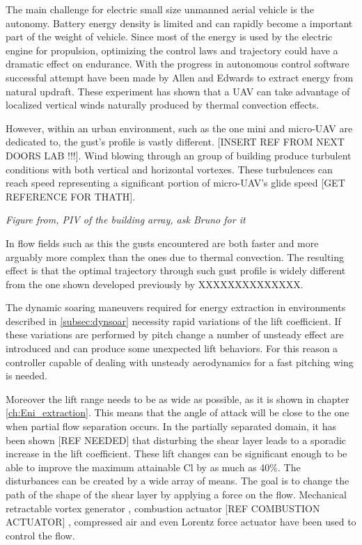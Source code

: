 
 \label{subsec:dynsoar}
The main challenge for electric small size unmanned aerial vehicle is the autonomy.
Battery energy density is limited and can rapidly become a important part of the weight of vehicle.
Since most of the energy is used by the electric engine for propulsion, optimizing the control laws and trajectory could have a dramatic effect on endurance. 
With the progress in autonomous control software successful attempt have been made by Allen \cite{flight_test_soaring_NASA} and Edwards \cite{flight_test_soaring_NCU} to extract energy from natural updraft.
These experiment has shown that a UAV can take advantage of localized vertical winds naturally produced by thermal convection effects.

\par However, within an urban environment, such as the one mini and micro-UAV are dedicated to, the gust's profile is vastly different. [INSERT REF FROM NEXT DOORS LAB !!!]. 
Wind blowing through an group of building produce turbulent conditions with both vertical and horizontal vortexes.
These turbulences can reach speed representing a significant portion of micro-UAV's glide speed [GET REFERENCE FOR THATH].

\par \emph{Figure from, PIV of the building array, ask Bruno for it}

\par In flow fields such as this the gusts encountered are both faster and more arguably more complex than the ones due to thermal convection.
The resulting effect is that the optimal trajectory through such gust profile is widely different from the one shown developed previously by XXXXXXXXXXXXXX.


The dynamic soaring maneuvers required for energy extraction in environments described in \ref{subsec:dynsoar} necessity rapid variations of the lift coefficient. 
If these variations are performed by pitch change a number of unsteady effect are introduced and can produce some unexpected lift behaviors.
For this reason a controller capable of dealing with unsteady aerodynamics for a fast pitching wing is needed.

\par Moreover the lift range needs to be as wide as possible, as it is shown in chapter \ref{ch:Eni_extraction}.
This means that the angle of attack will be close to the one when partial flow separation occurs.
In the partially separated domain, it has been shown [REF NEEDED] that disturbing the shear layer leads to a sporadic increase in the lift coefficient.
These lift changes can be significant enough to be able to improve the maximum attainable Cl by as much as 40\%.
The disturbances can be created by a wide array of means. 
The goal is to change the path of the shape of the shear layer by applying a force on the flow. 
Mechanical retractable vortex generator \cite{Onera_afc}, combustion actuator [REF COMBUSTION ACTUATOR] , compressed air \cite{Williams_afc} and even Lorentz force actuator \cite{Dresden_afc} have been used to control the flow.

